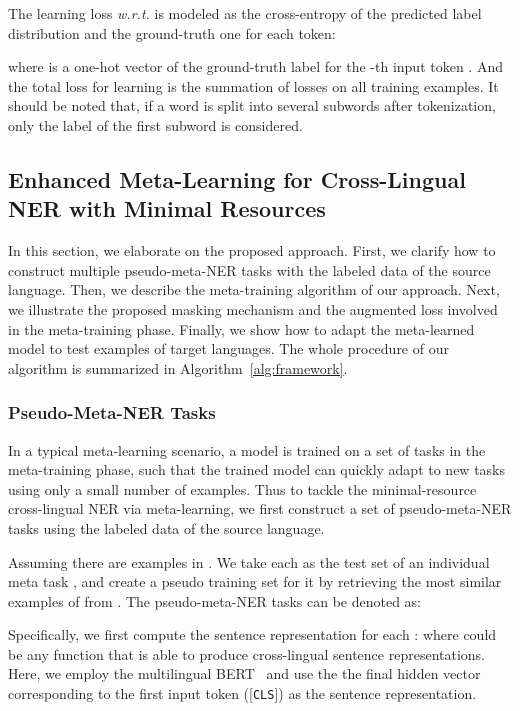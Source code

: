 \documentclass[letterpaper]{article} \usepackage{aaai20}  \usepackage{times}  \usepackage{helvet} \usepackage{courier}  \usepackage[hyphens]{url}  \usepackage{graphicx} \urlstyle{rm} \def\UrlFont{\rm}  \usepackage{graphicx}
\begin{document}
The learning loss \textit{w.r.t.}  is modeled as the cross-entropy of the predicted label distribution and the ground-truth one for each token:

where  is a one-hot vector of the ground-truth label for the -th input token . 
And the total loss for learning is the summation of losses on all training examples. 
It should be noted that, if a word is split into several subwords after tokenization, only the label of the first subword is considered. 

\subsection{Enhanced Meta-Learning for Cross-Lingual NER with Minimal Resources}
In this section, we elaborate on the proposed approach.
First, we clarify how to construct multiple pseudo-meta-NER tasks with the labeled data of the source language.
Then, we describe the meta-training algorithm of our approach.
Next, we illustrate the proposed masking mechanism and the augmented loss involved in the meta-training phase.
Finally, we show how to adapt the meta-learned model to test examples of target languages. 
The whole procedure of our algorithm is summarized in Algorithm~\ref{alg:framework}.

\subsubsection{Pseudo-Meta-NER Tasks}
In a typical meta-learning scenario, a model is trained on a set of tasks in the meta-training phase, such that the trained model can quickly adapt to new tasks using only a small number of examples.
Thus to tackle the minimal-resource cross-lingual NER via meta-learning, we first construct a set of pseudo-meta-NER tasks using the labeled data of the source language.

Assuming there are  examples in . We take each  as the test set  of an individual meta task , and create a pseudo training set  for it by retrieving the most similar examples of  from . The pseudo-meta-NER tasks  can be denoted as:


Specifically, we first compute the sentence representation  for each : 
where  could be any function that is able to produce cross-lingual sentence representations. Here, we employ the multilingual BERT~\cite{devlin2019bert} and use the the final hidden vector corresponding to the first input token ([\texttt{CLS}]) as the sentence representation.
\end{document}
